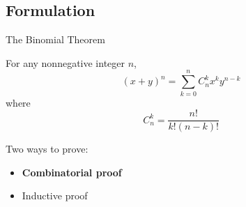 \documentclass{beamer}
\begin{document}
\subsection{Formulation}
\begin{frame}{The Binomial Theorem}
    \begin{theorem}
    For any nonnegative integer $n$,
    \begin{displaymath}
    (x+y)^n=\sum_{k=0}^nC_n^k
    x^ky^{n-k}
    \end{displaymath}
    where 
    $$C_n^k=\frac{n!}{k!(n-k)!} $$
    \end{theorem}
    \vskip 0.5cm
    Two ways to prove:
    \begin{itemize}
    \item \textbf{Combinatorial proof}
    \item Inductive proof
    \end{itemize}
\end{frame}
\end{document}
